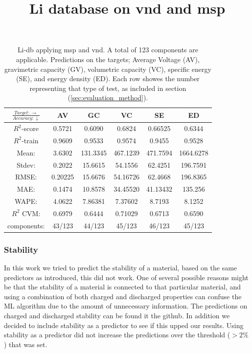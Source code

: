 \begin{table}[H]
\scriptsize
\centering
\caption{Li-db applying msp and vnd. A total of 123 components are applicable. Predictions on the targets; Average Voltage (AV), gravimetric capacity (GV), volumetric capacity (VC), specific energy (SE), and energy density (ED). Each row showes the number representing that type of test, as included in section (\ref{sec:evaluation_method}).}
\title{Li database on vnd and msp}
\begin{tabular}{|c|c|c|c|c|c|}
	\hline 
	$\frac{Target: \rightarrow}{Accuracy:\downarrow} $ & AV & GC & VC & SE & ED 
	 \\ 
	\hline
	$R^2$-score 	& 0.5721 & 0.6090 & 0.6824 & 0.66525 &  0.6344\\ 
	\hline 
	$R^2$-train 	& 0.9609 & 0.9533 & 0.9574 & 0.9455 &  0.9528 \\ 
	\hline
	Mean: 	 	& 3.6302	&131.3345&467.1239& 471.7594& 1664.6278\\
	\hline 
	Stdev:	 	& 0.2022	&15.6615	&54.1556 	&62.4251	& 196.7591\\
	\hline 
	RMSE: 		&0.20225& 15.6676 &  54.16726 & 62.4668 &196.8365\\ 
	\hline
	MAE: 		& 0.1474 & 10.8578& 34.45520 & 41.13432 & 135.256 \\ 
	\hline
	WAPE: 		& 4.0622 & 7.86381 & 7.37602  & 8.7193 & 8.1252 \\
	\hline
	$R^2$ CVM: 	& 0.6979 	& 0.6444 	& 0.71029 & 0.6713 &0.6590 \\
	\hline
	components: 	& 43/123 	& 44/123 	& 45/123 	 & 46/123 	&45/123 \\
	\hline
\end{tabular}
\label{tab:mg-vnd-msp}
\end{table}



\subsubsection*{Stability}

In this work we tried to predict the stability of a material, based on the same predictors as introduced, this did not work. One of several possible reasons might be that the stability of a material is connected to that particular material, and using a combination of both charged and discharged properties can confuse the ML algorithm due to the amount of unnecessary information. The predictions on charged and discharged stability can be found it the github. In addition we decided to include stability as a predictor to see if this upped our results. Using stability as a predictor did not increase the predictions over the threshold ($>2\%$) that was set.


